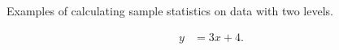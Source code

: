 


\begin{problem}
\item Examples of calculating sample statistics on data with two levels.

  \begin{subproblem}
  \item 
    \begin{eqnarray}
      y & = 3x + 4.
    \end{eqnarray}
    \vfill
  \end{subproblem}


\end{problem}





\begin{problem}
  \item ~
\end{problem}




\begin{problem}
\item ~  
\end{problem}
